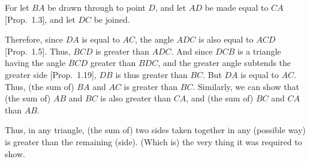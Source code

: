 \begin{Parallel}{}{}
{For let $BA$ be drawn through to point $D$, and let $AD$ be made equal to $CA$ [Prop.~1.3], and let $DC$ be joined.

Therefore, since $DA$ is equal to $AC$, the angle $ADC$ is also equal to
$ACD$ [Prop.~1.5]. Thus, $BCD$ is greater than $ADC$. And since
 $DCB$ is a triangle having the angle $BCD$ greater than $BDC$, and the
greater angle subtends the greater side [Prop.~1.19], $DB$ is thus
greater than $BC$. But $DA$ is equal to $AC$. Thus, (the sum of) $BA$ and $AC$ is
greater than $BC$. Similarly, we can show that (the sum of) $AB$ and $BC$ is also
greater than $CA$, and (the sum of) $BC$ and $CA$ than $AB$.

Thus, in any triangle, (the sum of) two sides taken together in any (possible way) is greater than the remaining (side). (Which is) the very thing
it was required to show.}
\end{Parallel}

